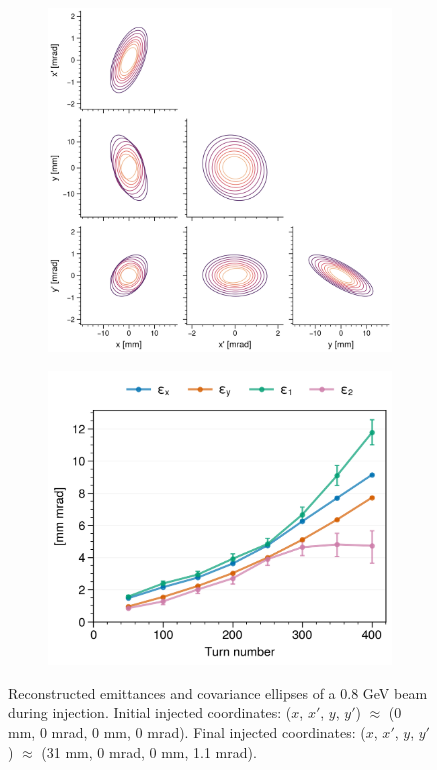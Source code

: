 \begin{figure}[!p]
    \centering
    \begin{subfigure}{0.6\textwidth}
        \includegraphics[width=\textwidth]{Images/chapter5/exp3/corner.png}
    \end{subfigure}
    \hfill
    \begin{subfigure}[t]{0.39\textwidth}
        \includegraphics[width=\textwidth]{Images/chapter5/exp3/emittances.png}
    \end{subfigure}
    \caption{Reconstructed emittances and covariance ellipses of a 0.8 GeV beam during injection. Initial injected coordinates: ($x$, $x'$, $y$, $y'$) $\approx$ (0 mm, 0 mrad, 0 mm, 0 mrad). Final injected coordinates: ($x$, $x'$, $y$, $y'$) $\approx$ (31 mm, 0 mrad, 0 mm, 1.1 mrad).}
    \label{fig:exp3_emittances}
\end{figure}
% 

